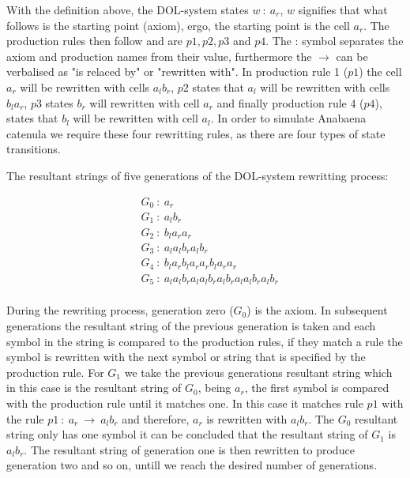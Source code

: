 \begin{flushleft}
\vspace{5mm}

With the definition above, the DOL-system states $w~ :~ a_r$, $w$ signifies that what follows is the starting point (axiom), ergo, the starting point is the cell $a_r$. The production rules then follow and are $p1, p2, p3$ and $p4$. The : symbol separates the axiom and production names from their value, furthermore the $\rightarrow$ can be verbalised as "is relaced by" or "rewritten with". In production rule 1 ($p1$) the cell $a_r$ will be rewritten with cells $a_l b_r$, $p2$ states that $a_l$ will be rewritten with cells $b_l a_r$, $p3$ states $b_r$ will rewritten with cell $a_r$ and finally production rule 4 ($p4$), states that $b_l$ will be rewritten with cell $a_l$. In order to simulate Anabaena catenula we require these four rewritting rules, as there are four types of state transitions. \\

\vspace{5mm}

The resultant strings of five generations of the DOL-system rewritting process: \\

\vspace{5mm}

\begin{equation} \label{DOL-system result string}
\begin{aligned}
	& G_0~ :~ a_r \\
	& G_1~ :~ a_l b_r \\
	& G_2~ :~ b_l a_r a_r \\
	& G_3~ :~ a_l a_l b_r a_l b_r \\
	& G_4~ :~ b_l a_r b_l a_r a_r b_l a_r a_r \\
	& G_5~ :~ a_l a_l b_r a_l a_l b_r a_l b_r a_l a_l b_r a_l b_r \\
\end{aligned}
\end{equation}

\vspace{5mm}

During the rewriting process, generation zero ($G_0$) is the axiom. In subsequent generations the resultant string of the previous generation is taken and each symbol in the string is compared to the production rules, if they match a rule the symbol is rewritten with the next symbol or string that is specified by the production rule. For $G_1$ we take the previous generations resultant string which in this case is the resultant string of $G_0$, being $a_r$, the first symbol is compared with the production rule until it matches one. In this case it matches rule $p1$ with the rule $p1~ :~ a_r~ \rightarrow~ a_l b_r$ and therefore, $a_r$ is rewritten with $a_l b_r$. The $G_0$ resultant string only has one symbol it can be concluded that the resultant string of $G_1$ is $a_l b_r$. The resultant string of generation one is then rewritten to produce generation two and so on, untill we reach the desired number of generations.\\


\end{flushleft}
